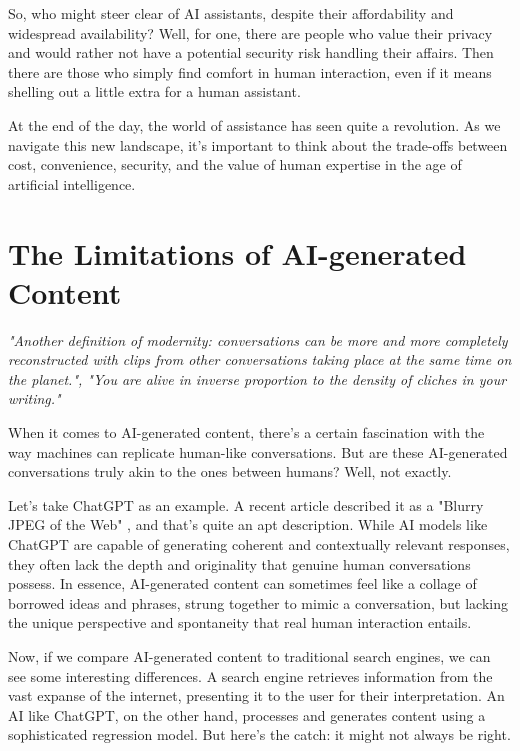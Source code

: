 So, who might steer clear of AI assistants, despite their affordability and widespread availability? Well, for one, there are people who value their privacy and would rather not have a potential security risk handling their affairs. Then there are those who simply find comfort in human interaction, even if it means shelling out a little extra for a human assistant.

At the end of the day, the world of assistance has seen quite a revolution. As we navigate this new landscape, it's important to think about the trade-offs between cost, convenience, security, and the value of human expertise in the age of artificial intelligence.

\section{The Limitations of AI-generated Content}

\textit{"Another definition of modernity: conversations can be more and more completely reconstructed with clips from other conversations taking place at the same time on the planet.", "You are alive in inverse proportion to the density of cliches in your writing."}\cite{procrustes}

When it comes to AI-generated content, there's a certain fascination with the way machines can replicate human-like conversations. But are these AI-generated conversations truly akin to the ones between humans? Well, not exactly.

Let's take ChatGPT as an example. A recent article described it as a "Blurry JPEG of the Web" \cite{newyorkerChatGPTBlurry}, and that's quite an apt description. While AI models like ChatGPT are capable of generating coherent and contextually relevant responses, they often lack the depth and originality that genuine human conversations possess. In essence, AI-generated content can sometimes feel like a collage of borrowed ideas and phrases, strung together to mimic a conversation, but lacking the unique perspective and spontaneity that real human interaction entails.

Now, if we compare AI-generated content to traditional search engines, we can see some interesting differences. A search engine retrieves information from the vast expanse of the internet, presenting it to the user for their interpretation. An AI like ChatGPT, on the other hand, processes and generates content using a sophisticated regression model. But here's the catch: it might not always be right.

